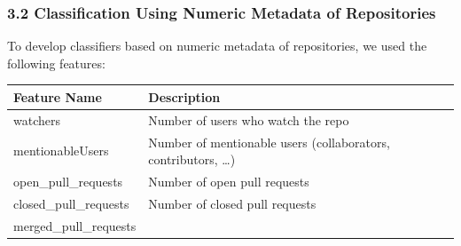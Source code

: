 \documentclass{article}
\begin{document}
\subsubsection{3.2 Classification Using Numeric Metadata of
Repositories}\label{classification-using-numeric-metadata-of-repositories}

To develop classifiers based on numeric metadata of repositories, we
used the following features:

\begin{longtable}[]{@{}ll@{}}
\toprule
\begin{minipage}[b]{0.17\columnwidth}\raggedright\strut
Feature Name\strut
\end{minipage} & \begin{minipage}[b]{0.16\columnwidth}\raggedright\strut
Description\strut
\end{minipage}\tabularnewline
\midrule
\endhead
\begin{minipage}[t]{0.17\columnwidth}\raggedright\strut
watchers\strut
\end{minipage} & \begin{minipage}[t]{0.16\columnwidth}\raggedright\strut
Number of users who watch the repo\strut
\end{minipage}\tabularnewline
\begin{minipage}[t]{0.17\columnwidth}\raggedright\strut
mentionableUsers\strut
\end{minipage} & \begin{minipage}[t]{0.16\columnwidth}\raggedright\strut
Number of mentionable users (collaborators, contributors,
\ldots{})\strut
\end{minipage}\tabularnewline
\begin{minipage}[t]{0.17\columnwidth}\raggedright\strut
open\_pull\_requests\strut
\end{minipage} & \begin{minipage}[t]{0.16\columnwidth}\raggedright\strut
Number of open pull requests\strut
\end{minipage}\tabularnewline
\begin{minipage}[t]{0.17\columnwidth}\raggedright\strut
closed\_pull\_requests\strut
\end{minipage} & \begin{minipage}[t]{0.16\columnwidth}\raggedright\strut
Number of closed pull requests\strut
\end{minipage}\tabularnewline
\begin{minipage}[t]{0.17\columnwidth}\raggedright\strut
merged\_pull\_requests\strut

\end{minipage}
\end{longtable}
\end{document}

